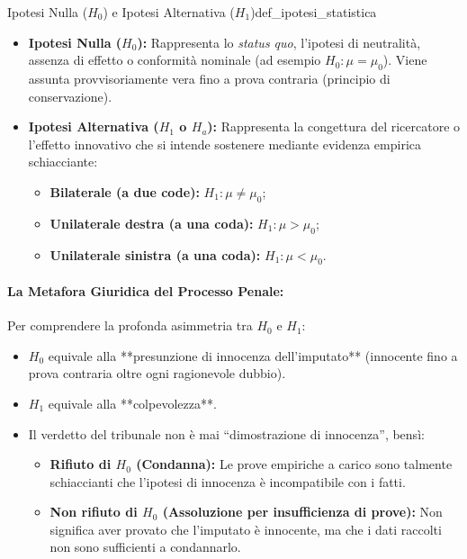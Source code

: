 \begin{definizione}{Ipotesi Nulla ($H_0$) e Ipotesi Alternativa ($H_1$)}{def_ipotesi_statistica}
\begin{itemize}
    \item \textbf{Ipotesi Nulla ($H_0$):} Rappresenta lo \emph{status quo}, l'ipotesi di neutralità, assenza di effetto o conformità nominale (ad esempio $H_0: \mu = \mu_0$). Viene assunta provvisoriamente vera fino a prova contraria (principio di conservazione).
    \item \textbf{Ipotesi Alternativa ($H_1$ o $H_a$):} Rappresenta la congettura del ricercatore o l'effetto innovativo che si intende sostenere mediante evidenza empirica schiacciante:
    \begin{itemize}
        \item \textbf{Bilaterale (a due code):} $H_1: \mu \neq \mu_0$;
        \item \textbf{Unilaterale destra (a una coda):} $H_1: \mu > \mu_0$;
        \item \textbf{Unilaterale sinistra (a una coda):} $H_1: \mu < \mu_0$.
    \end{itemize}
\end{itemize}
\end{definizione}

\paragraph{La Metafora Giuridica del Processo Penale:}
Per comprendere la profonda asimmetria tra $H_0$ e $H_1$:
\begin{itemize}
    \item $H_0$ equivale alla **presunzione di innocenza dell'imputato** (innocente fino a prova contraria oltre ogni ragionevole dubbio).
    \item $H_1$ equivale alla **colpevolezza**.
    \item Il verdetto del tribunale non è mai ``dimostrazione di innocenza'', bensì:
    \begin{itemize}
        \item \textbf{Rifiuto di $H_0$ (Condanna):} Le prove empiriche a carico sono talmente schiaccianti che l'ipotesi di innocenza è incompatibile con i fatti.
        \item \textbf{Non rifiuto di $H_0$ (Assoluzione per insufficienza di prove):} Non significa aver provato che l'imputato è innocente, ma che i dati raccolti non sono sufficienti a condannarlo.
    \end{itemize}
\end{itemize}

